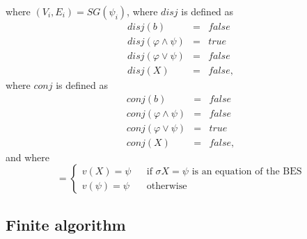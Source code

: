 where $(V_{i},E_{i})=SG(\psi _{i})$, where $disj$ is defined as%
\begin{eqnarray*}
disj(b) &=&false \\
disj(\varphi \wedge \psi ) &=&true \\
disj(\varphi \vee \psi ) &=&false \\
disj(X) &=&false,
\end{eqnarray*}%
where $conj$ is defined as%
\begin{eqnarray*}
conj(b) &=&false \\
conj(\varphi \wedge \psi ) &=&false \\
conj(\varphi \vee \psi ) &=&true \\
conj(X) &=&false,
\end{eqnarray*}%
and where%
\begin{equation*}
=\left\{ 
\begin{array}{ccc}
v(X)=\psi  &  & \text{if }\sigma X=\psi \text{ is an equation of the BES} \\ 
v(\psi )=\psi  &  & \text{otherwise}%
\end{array}%
\right. 
\end{equation*}

\newpage

\subsection{Finite algorithm}

